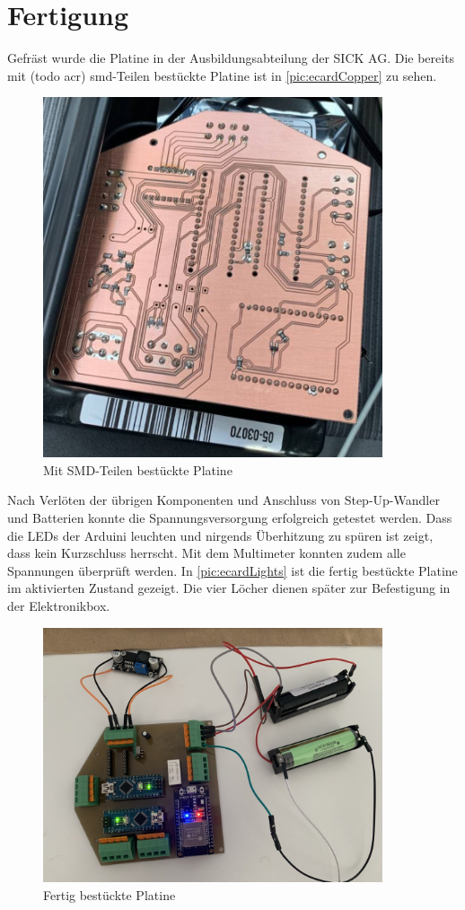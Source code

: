 \section{Fertigung}
Gefräst wurde die Platine in der Ausbildungsabteilung der SICK AG. Die bereits mit (todo acr) smd-Teilen bestückte Platine ist in \autoref{pic:ecardCopper} zu sehen. 

\begin{figure}[h]
	\begin{center}
		\includegraphics[width = 10cm]{eCardCopper.jpg}
		\caption{\label{pic:ecardCopper}Mit SMD-Teilen bestückte Platine}
	\end{center}
\end{figure}

Nach Verlöten der übrigen Komponenten und Anschluss von Step-Up-Wandler und Batterien konnte die Spannungsversorgung erfolgreich getestet werden. Dass die LEDs der Arduini leuchten und nirgends Überhitzung zu spüren ist zeigt, dass kein Kurzschluss herrscht. Mit dem Multimeter konnten zudem alle Spannungen überprüft werden. In \autoref{pic:ecardLights} ist die fertig bestückte Platine im aktivierten Zustand gezeigt. Die vier Löcher dienen später zur Befestigung in der Elektronikbox.


\begin{figure}
	\begin{center}
		\includegraphics[width=10cm]{ecardLight.jpg}
		\caption{\label{pic:ecardLights}Fertig bestückte Platine}
	\end{center}
\end{figure}

